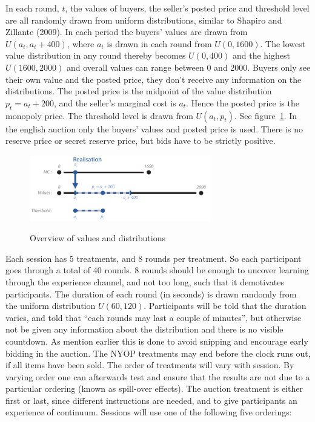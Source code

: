 \documentclass[a4paper,12pt]{article}
\begin{document}
	In each round, $t$, the values of buyers, the seller's posted price and threshold level are all randomly drawn from uniform distributions, similar to Shapiro and Zillante (2009). In each period the buyers' values are drawn from $U(a_t , a_t + 400)$, where $a_t$ is drawn in each round from $U(0, 1600)$. The lowest value distribution in any round thereby becomes $U(0, 400)$ and the highest $U(1600, 2000)$ and overall values can range between 0 and 2000. Buyers only see their own value and the posted price, they don't receive any information on the distributions. The posted price is the midpoint of the value distribution $p_t = a_t + 200$, and the seller's marginal cost is $a_t$. Hence the posted price is the monopoly price. The threshold level is drawn from $U(a_t, p_t)$. See figure~\ref{fig:distribution}. In the english auction only the buyers' values and posted price is used. There is no reserve price or secret reserve price, but bids have to be strictly positive.
	
	\begin{figure}[h]
	        \centering
	        \caption{Overview of values and distributions}
	        \includegraphics[width=0.7\textwidth]{Figures/Distribution}
			\label{fig:distribution}
	\end{figure}

	Each session has 5 treatments, and 8 rounds per treatment. So each participant goes through a total of 40 rounds. 8 rounds should be enough to uncover learning through the experience channel, and not too long, such that it demotivates participants. The duration of each round (in seconds) is drawn randomly from the uniform distribution $U(60, 120)$. Participants will be told that the duration varies, and told that ``each rounds may last a couple of minutes'', but otherwise not be given any information about the distribution and there is no visible countdown. As mention earlier this is done to avoid snipping and encourage early bidding in the auction. The NYOP treatments may end before the clock runs out, if all items have been sold. The order of treatments will vary with session. By varying order one can afterwards test and ensure that the results are not due to a particular ordering (known as spill-over effects). The auction treatment is either first or last, since different instructions are needed, and to give participants an experience of continuum. Sessions will use one of the following five orderings:
\end{document}
